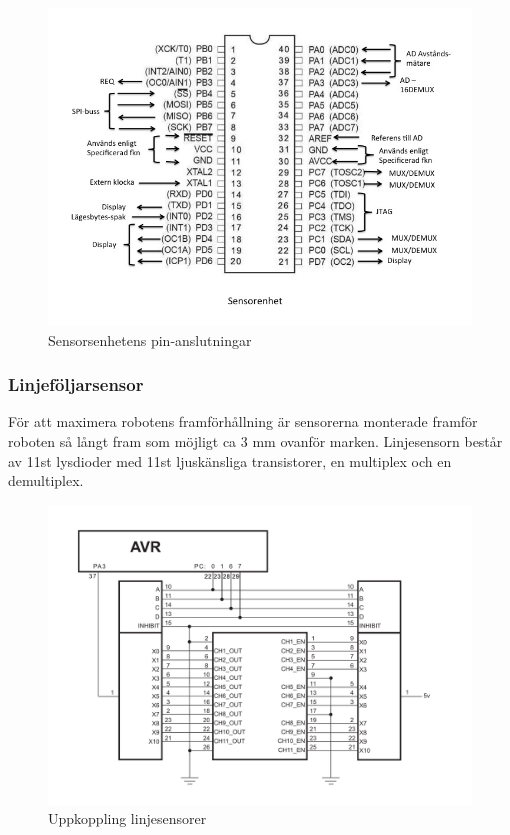 \begin{figure}[H]
  \centering
 \includegraphics[angle=0,scale=0.5]{bilder/PIN_sensor.jpg}
  \caption{Sensorsenhetens pin-anslutningar}
  \label{fig:PINsensor}
\end{figure}

\subsubsection{Linjeföljarsensor}
\label{sec:linjesensor}
För att maximera robotens framförhållning är sensorerna monterade framför roboten 
så långt fram som möjligt ca 3 mm ovanför marken. Linjesensorn består av 11st lysdioder 
med 11st ljuskänsliga transistorer, en multiplex och en demultiplex.

\begin{figure}[H]
  \centering
 \includegraphics[angle=0,scale=0.5]{bilder/Uppkoppling_linjesensorer.pdf}
  \caption{Uppkoppling linjesensorer}
  \label{fig:Uppkoppling_linjesensorer}
\end{figure}


